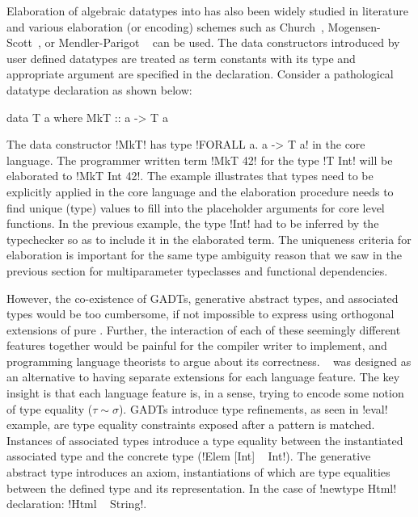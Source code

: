 \documentclass[screen,nonacm,manuscript,review]{acmart} %
\begin{document}
Elaboration of algebraic datatypes into \SF has also been widely
studied in literature and various elaboration (or encoding) schemes
such as Church~\cite{jansen_efficient_2005,jansen_programming_2013},
Mogensen-Scott~\cite{mogensen_efficient_1992}, or Mendler-Parigot
~\cite{parigot_representation_1990, stump_efficiency_2016} can be used.
The data constructors introduced by user defined datatypes are treated as
term constants with its type and appropriate argument are specified in
the declaration. Consider a pathological datatype declaration as shown
below:

\begin{CenteredBox}
\begin{code}
  data T a where MkT :: a -> T a
\end{code}
\end{CenteredBox}

The data constructor !MkT! has type !FORALL a. a -> T a! in the
core language. The programmer written term !MkT 42! for the type
!T Int! will be elaborated to !MkT Int 42!. The example illustrates
that types need to be explicitly applied in the core language and the
elaboration procedure needs to find unique (type) values to fill into the
placeholder arguments for core level functions. In the previous
example, the type !Int! had to be inferred by the typechecker so as
to include it in the elaborated term. The uniqueness criteria for
elaboration is important for the same type ambiguity reason that we saw
in the previous section for multiparameter typeclasses and functional
dependencies.

However, the co-existence of GADTs, generative abstract
types, and associated types would be too cumbersome, if not impossible
to express using orthogonal extensions of pure \SF. Further, the
interaction of each of these seemingly different features together would
be painful for the compiler writer to implement, and programming
language theorists to argue about its
correctness. \SFC~\cite{sulzmann_system_2007} was designed as an
alternative to having separate extensions for
each language feature. The key insight is that each language feature
is, in a sense, trying to encode some notion of type equality
($\tau\sim\sigma$). GADTs introduce type refinements, as seen in
!eval! example, are type equality constraints exposed after a pattern
is matched. Instances of associated types introduce a type equality
between the instantiated associated type and the concrete type
(!Elem [Int] ~ Int!). The generative abstract type introduces an axiom,
instantiations of which are type equalities between the defined type
and its representation. In the case of !newtype Html! declaration:
!Html ~ String!. %
\end{document}
